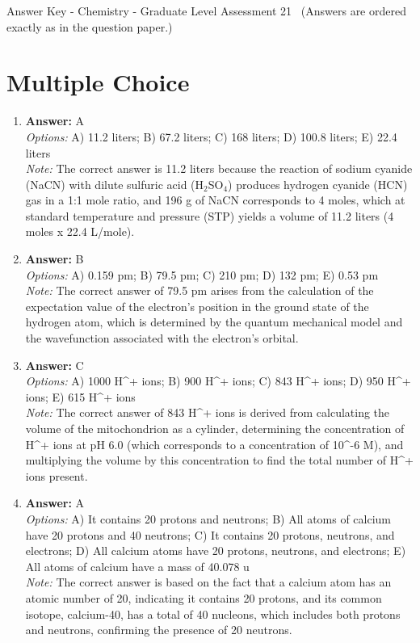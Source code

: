\documentclass[12pt]{article}
\begin{document}
\begin{center}
Answer Key - Chemistry - Graduate Level Assessment 21 \
\small (Answers are ordered exactly as in the question paper.)
\end{center}

\section*{Multiple Choice}
\begin{enumerate}[label=\arabic*.]
\item \textbf{Answer:} A
\\ \textit{Options:} A) 11.2 liters; B) 67.2 liters; C) 168 liters; D) 100.8 liters; E) 22.4 liters
\\ \textit{Note:} The correct answer is 11.2 liters because the reaction of sodium cyanide (NaCN) with dilute sulfuric acid (H$_{2}$SO$_{4}$) produces hydrogen cyanide (HCN) gas in a 1:1 mole ratio, and 196 g of NaCN corresponds to 4 moles, which at standard temperature and pressure (STP) yields a volume of 11.2 liters (4 moles x 22.4 L/mole).
\item \textbf{Answer:} B
\\ \textit{Options:} A) 0.159 pm; B) 79.5 pm; C) 210 pm; D) 132 pm; E) 0.53 pm
\\ \textit{Note:} The correct answer of 79.5 pm arises from the calculation of the expectation value of the electron's position in the ground state of the hydrogen atom, which is determined by the quantum mechanical model and the wavefunction associated with the electron's orbital.
\item \textbf{Answer:} C
\\ \textit{Options:} A) 1000 H^+ ions; B) 900 H^+ ions; C) 843 H^+ ions; D) 950 H^+ ions; E) 615 H^+ ions
\\ \textit{Note:} The correct answer of 843 H^+ ions is derived from calculating the volume of the mitochondrion as a cylinder, determining the concentration of H^+ ions at pH 6.0 (which corresponds to a concentration of 10^-6 M), and multiplying the volume by this concentration to find the total number of H^+ ions present.
\item \textbf{Answer:} A
\\ \textit{Options:} A) It contains 20 protons and neutrons; B) All atoms of calcium have 20 protons and 40 neutrons; C) It contains 20 protons, neutrons, and electrons; D) All calcium atoms have 20 protons, neutrons, and electrons; E) All atoms of calcium have a mass of 40.078 u
\\ \textit{Note:} The correct answer is based on the fact that a calcium atom has an atomic number of 20, indicating it contains 20 protons, and its common isotope, calcium-40, has a total of 40 nucleons, which includes both protons and neutrons, confirming the presence of 20 neutrons.

\end{enumerate}
\end{document}
